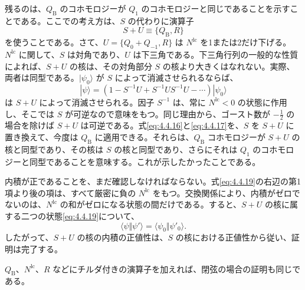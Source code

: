 残るのは、$Q_{\mathrm B}$ のコホモロジーが $Q_1$ のコホモロジーと同じであることを示すことである。ここでの考え方は、$S$ の代わりに演算子
\begin{equation}
S+U\equiv\{Q_{\mathrm B},R\}
\tag{4.4.18}\label{eq:4.4.18}
\end{equation}
を使うことである。さて、$U=\{Q_0+Q_{-1},R\}$ は $N^{\mathrm{lc}}$ を1または2だけ下げる。$N^{\mathrm{lc}}$ に関して、$S$ は対角であり、$U$ は下三角である。下三角行列の一般的な性質によれば、$S+U$ の核は、その対角部分 $S$ の核より大きくはなれない。実際、両者は同型である。$|\psi_0\rangle$ が $S$ によって消滅させられるならば、
\begin{equation}
|\psi\rangle=(1-S^{-1}U+S^{-1}US^{-1}U-\cdots)|\psi_0\rangle
\tag{4.4.19}\label{eq:4.4.19}
\end{equation}
は $S+U$ によって消滅させられる。因子 $S^{-1}$ は、常に $N^{\mathrm{lc}}<0$ の状態に作用し、そこでは $S$ が可逆なので意味をもつ。同じ理由から、ゴースト数が $-\tfrac12$ の場合を除けば $S+U$ は可逆である。式\eqref{eq:4.4.16}と\eqref{eq:4.4.17}を、$S$ を $S+U$ に置き換えて、今度は $Q_{\mathrm B}$ に適用できる。それらは、$Q_{\mathrm B}$ コホモロジーが $S+U$ の核と同型であり、その核は $S$ の核と同型であり、さらにそれは $Q_1$ のコホモロジーと同型であることを意味する。これが示したかったことである。

内積が正であることを、まだ確認しなければならない。式\eqref{eq:4.4.19}の右辺の第1項より後の項は、すべて厳密に負の $N^{\mathrm{lc}}$ をもつ。交換関係により、内積がゼロでないのは、$N^{\mathrm{lc}}$ の和がゼロになる状態の間だけである。すると、$S+U$ の核に属する二つの状態\eqref{eq:4.4.19}について、
\begin{equation}
\langle\psi\Vert\psi'\rangle=\langle\psi_0\Vert\psi'_0\rangle .
\tag{4.4.20}\label{eq:4.4.20}
\end{equation}
したがって、$S+U$ の核の内積の正値性は、$S$ の核における正値性から従い、証明は完了する。

$Q_{\mathrm B}$、$N^{\mathrm{lc}}$、$R$ などにチルダ付きの演算子を加えれば、閉弦の場合の証明も同じである。



